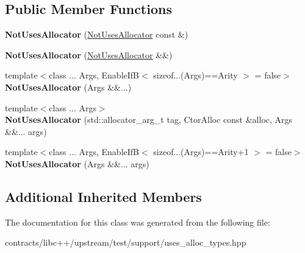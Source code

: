 \subsection*{Public Member Functions}
\begin{DoxyCompactItemize}
\item 
\mbox{\label{class_not_uses_allocator_a6bfa3095808787e809cd340cb7d84cfc}} 
{\bfseries Not\+Uses\+Allocator} (\mbox{\hyperlink{class_not_uses_allocator}{Not\+Uses\+Allocator}} const \&)
\item 
\mbox{\label{class_not_uses_allocator_a0cde6301573567a839cdba7c50afdf30}} 
{\bfseries Not\+Uses\+Allocator} (\mbox{\hyperlink{class_not_uses_allocator}{Not\+Uses\+Allocator}} \&\&)
\item 
\mbox{\label{class_not_uses_allocator_a9b5db6228923d12efeb62cfbae37463e}} 
{\footnotesize template$<$class ... Args, Enable\+If\+B$<$ sizeof...(\+Args)==\+Arity $>$  = false$>$ }\\{\bfseries Not\+Uses\+Allocator} (Args \&\&...)
\item 
\mbox{\label{class_not_uses_allocator_a8f84665417429d20f4387275d1889a66}} 
{\footnotesize template$<$class ... Args$>$ }\\{\bfseries Not\+Uses\+Allocator} (std\+::allocator\+\_\+arg\+\_\+t tag, Ctor\+Alloc const \&alloc, Args \&\&... args)
\item 
\mbox{\label{class_not_uses_allocator_a6fe6c721858dfe626af546ba2225bb07}} 
{\footnotesize template$<$class ... Args, Enable\+If\+B$<$ sizeof...(\+Args)==\+Arity+1 $>$  = false$>$ }\\{\bfseries Not\+Uses\+Allocator} (Args \&\&... args)
\end{DoxyCompactItemize}
\subsection*{Additional Inherited Members}


The documentation for this class was generated from the following file\+:\begin{DoxyCompactItemize}
\item 
contracts/libc++/upstream/test/support/uses\+\_\+alloc\+\_\+types.\+hpp\end{DoxyCompactItemize}
